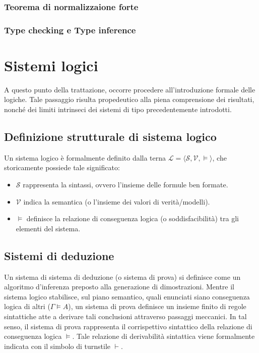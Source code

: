 \subsubsection{Teorema di normalizzaione forte}
\subsubsection{Type checking e Type inference}

\section{Sistemi logici}
A questo punto della trattazione, occorre procedere all'introduzione formale delle logiche. Tale passaggio risulta propedeutico alla piena comprensione dei risultati, 
nonché dei limiti intrinseci dei sistemi di tipo precedentemente introdotti.

\subsection{Definizione strutturale di sistema logico} 
Un sistema logico è formalmente definito dalla terna $\mathcal{L} = \langle \mathcal{S}, \mathcal{V}, \models \rangle$, che storicamente possiede tale significato:
\begin{itemize}[nosep, leftmargin=1.5em]
    \item $\mathcal{S}$ rappresenta la sintassi, ovvero l'insieme delle formule ben formate.
    \item $\mathcal{V}$ indica la semantica (o l'insieme dei valori di verità/modelli).
    \item $\models$ definisce la relazione di conseguenza logica (o soddisfacibilità) tra gli elementi del sistema.
\end{itemize}


\subsection{Sistemi di deduzione}
Un sistema di sistema di deduzione (o sistema di prova) si definisce come un algoritmo d'inferenza preposto alla generazione di dimostrazioni. Mentre il sistema logico stabilisce, 
sul piano semantico, quali enunciati siano conseguenza logica di altri ($\Gamma \models A$), un sistema di prova definisce un insieme finito di regole sintattiche atte 
a derivare tali conclusioni attraverso passaggi meccanici. In tal senso, il sistema di prova rappresenta il corrispettivo sintattico della relazione di conseguenza logica
$\models$. Tale relazione di derivabilità sintattica viene formalmente indicata con il simbolo di turnstile $\vdash$.

